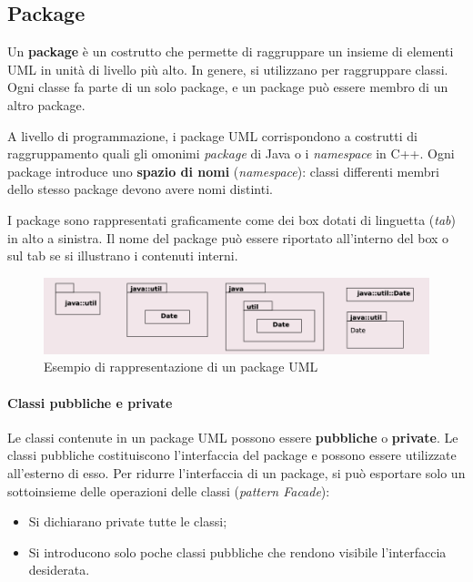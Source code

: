 \subsection{Package}

Un \textbf{package} è un costrutto che permette di raggruppare un insieme di elementi UML in unità di livello più alto. In genere, si utilizzano per raggruppare classi. Ogni classe fa parte di un solo package, e un package può essere membro di un altro package.

A livello di programmazione, i package UML corrispondono a costrutti di raggruppamento quali gli omonimi \textit{package} di Java o i \textit{namespace} in C++. Ogni package introduce uno \textbf{spazio di nomi} (\textit{namespace}): classi differenti membri dello stesso package devono avere nomi distinti.

I package sono rappresentati graficamente come dei box dotati di linguetta (\textit{tab}) in alto a sinistra. Il nome del package può essere riportato all’interno del box o sul tab se si illustrano i contenuti interni.

\begin{figure}[H]
    \centering
    \includegraphics[width=0.75\linewidth]{assets/UML/package/package-1.png}
    \caption{Esempio di rappresentazione di un package UML}
\end{figure}

\paragraph{Classi pubbliche e private}
Le classi contenute in un package UML possono essere \textbf{pubbliche} o \textbf{private}. Le classi pubbliche costituiscono l’interfaccia del package e possono essere utilizzate all’esterno di esso. Per ridurre l’interfaccia di un package, si può esportare solo un sottoinsieme delle operazioni delle classi (\textit{pattern Facade}):
\begin{itemize}
    \item Si dichiarano private tutte le classi;
    \item Si introducono solo poche classi pubbliche che rendono visibile l’interfaccia desiderata.
\end{itemize}

